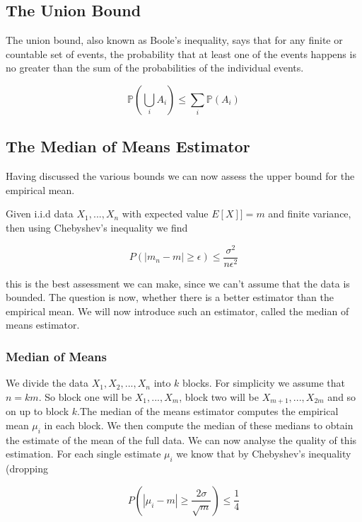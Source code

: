 \documentclass[12pt, authoryear]{elsarticle}
\begin{document}
\subsection{The Union Bound}

The union bound, also known as Boole's inequality, says that for any finite or countable set of events, the probability that at least one of the events happens is no greater than the sum of the probabilities of the individual events. 

$$\mathbb { P } \left( \bigcup _ { i } A _ { i } \right) \leq \sum _ { i } \mathbb { P } \left( A _ { i } \right)$$


\subsection{The Median of Means Estimator}

Having discussed the various bounds we can now assess the upper bound for the empirical mean. 

Given i.i.d data $X_1, ... , X_n$ with expected value $E[X]] = m$ and finite variance, then using Chebyshev's inequality we find

$$ P( | m_n - m| \geq \epsilon) \leq \frac{\sigma^2}{n \epsilon^2}$$

this is the best assessment we can make, since we can't assume that the data is bounded. The question is now, whether there is a better estimator than the empirical mean. We will now introduce such an estimator, called the median of means estimator.

\subsubsection{Median of Means}

We divide the data $X_1, X_2, ... , X_n$ into $k$ blocks. For simplicity we assume that $n=km$. So block one will be $X_1, ... , X_m$, block two will be $X_{m+1},..., X_{2m}$ and so on up to block $k$.The median of the means estimator computes the empirical mean $\mu_i$  in each block. We then compute the median of these medians to obtain the estimate of the mean of the full data. We can now analyse the quality of this estimation. 
For each single estimate $\mu_i$ we know that by Chebyshev's inequality (dropping 

$$ P(| \mu_i - m | \geq \frac{2 \sigma }{\sqrt{m}}) \leq \frac{1}{4}$$
\end{document}
